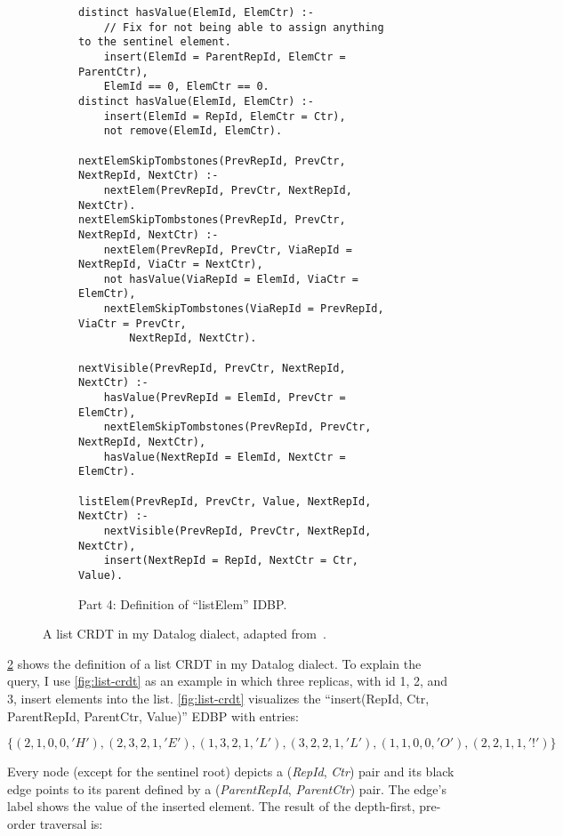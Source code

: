 \begin{figure}[htpb]\ContinuedFloat
	\centering

	\begin{subfigure}[b]{\textwidth}
		\begin{lstlisting}[keepspaces,escapechar=!]
distinct hasValue(ElemId, ElemCtr) :-
    // Fix for not being able to assign anything to the sentinel element.
    insert(ElemId = ParentRepId, ElemCtr = ParentCtr),
    ElemId == 0, ElemCtr == 0.
distinct hasValue(ElemId, ElemCtr) :-
    insert(ElemId = RepId, ElemCtr = Ctr),
    not remove(ElemId, ElemCtr).

nextElemSkipTombstones(PrevRepId, PrevCtr, NextRepId, NextCtr) :-
    nextElem(PrevRepId, PrevCtr, NextRepId, NextCtr).
nextElemSkipTombstones(PrevRepId, PrevCtr, NextRepId, NextCtr) :-
    nextElem(PrevRepId, PrevCtr, ViaRepId = NextRepId, ViaCtr = NextCtr),
    not hasValue(ViaRepId = ElemId, ViaCtr = ElemCtr),
    nextElemSkipTombstones(ViaRepId = PrevRepId, ViaCtr = PrevCtr,
        NextRepId, NextCtr).

nextVisible(PrevRepId, PrevCtr, NextRepId, NextCtr) :-
    hasValue(PrevRepId = ElemId, PrevCtr = ElemCtr),
    nextElemSkipTombstones(PrevRepId, PrevCtr, NextRepId, NextCtr),
    hasValue(NextRepId = ElemId, NextCtr = ElemCtr).

listElem(PrevRepId, PrevCtr, Value, NextRepId, NextCtr) :-
    nextVisible(PrevRepId, PrevCtr, NextRepId, NextCtr),
    insert(NextRepId = RepId, NextCtr = Ctr, Value).\end{lstlisting}
		\caption{Part 4: Definition of ``listElem'' \ac{IDBP}.}\label{code:list-crdt-datalog-dialect-part4}
	\end{subfigure}
	\caption{A list \ac{CRDT} in my Datalog dialect, adapted from~\cite{kleppmann2018data}.}\label{code:list-crdt-datalog-dialect}
\end{figure}



\ref{code:list-crdt-datalog-dialect} shows the definition of a list \ac{CRDT}
in my Datalog dialect.
To explain the query, I use \ref{fig:list-crdt} as an example in which
three replicas, with id 1, 2, and 3, insert elements into the list.
\ref{fig:list-crdt} visualizes the
``insert(RepId, Ctr, ParentRepId, ParentCtr, Value)'' \ac{EDBP} with entries:

\[\{ (2,1,0,0,'H'), (2,3,2,1,'E'), (1,3,2,1,'L'), (3,2,2,1,'L'), (1,1,0,0,'O'), (2,2,1,1,'!') \}\]

Every node (except for the sentinel root) depicts a (\textit{RepId}, \textit{Ctr})
pair and its black edge points to its parent defined by
a (\textit{ParentRepId}, \textit{ParentCtr}) pair.
The edge's label shows the value of the inserted element.
The result of the depth-first, pre-order traversal is:

